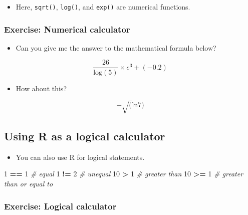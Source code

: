 \documentclass[
]{book}
\newenvironment{Shaded}{\begin{snugshade}}{\end{snugshade}}
\newcommand{\CommentTok}[1]{\textcolor[rgb]{0.56,0.35,0.01}{\textit{#1}}}
\newcommand{\DecValTok}[1]{\textcolor[rgb]{0.00,0.00,0.81}{#1}}
\newcommand{\SpecialCharTok}[1]{\textcolor[rgb]{0.81,0.36,0.00}{\textbf{#1}}}
\providecommand{\tightlist}{%
  \setlength{\itemsep}{0pt}\setlength{\parskip}{0pt}}
\begin{document}
\begin{itemize}
\tightlist
\item
  Here, \texttt{sqrt()}, \texttt{log()}, and \texttt{exp()} are numerical functions.
\end{itemize}

\subsubsection{Exercise: Numerical calculator}\label{exercise-numerical-calculator}

\begin{itemize}
\tightlist
\item
  Can you give me the answer to the mathematical formula below?
\end{itemize}

\[
\frac{26}{\text{log}(5)}\times e^{3} + (-0.2)
\]

\begin{itemize}
\tightlist
\item
  How about this?
\end{itemize}

\[
-\sqrt( \text{ln}7 )
\]

\subsection{Using R as a logical calculator}\label{using-r-as-a-logical-calculator}

\begin{itemize}
\tightlist
\item
  You can also use R for logical statements.
\end{itemize}

\begin{Shaded}
\begin{Highlighting}[]
\DecValTok{1} \SpecialCharTok{==} \DecValTok{1} \CommentTok{\# equal}
\DecValTok{1} \SpecialCharTok{!=} \DecValTok{2} \CommentTok{\# unequal}
\DecValTok{10} \SpecialCharTok{\textgreater{}} \DecValTok{1} \CommentTok{\# greater than}
\DecValTok{10} \SpecialCharTok{\textgreater{}=} \DecValTok{1} \CommentTok{\# greater than or equal to}
\end{Highlighting}
\end{Shaded}

\subsubsection{Exercise: Logical calculator}\label{exercise-logical-calculator}
\end{document}
